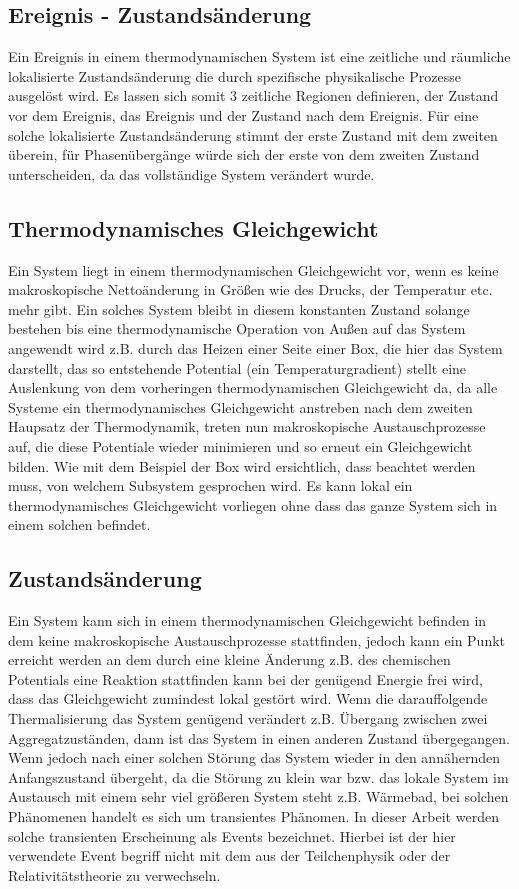 \subsection{Ereignis - Zustandsänderung}
\label{sec:theory-event}

Ein Ereignis in einem thermodynamischen System ist eine zeitliche und räumliche lokalisierte Zustandsänderung die durch spezifische physikalische Prozesse ausgelöst wird. Es lassen sich somit 3 zeitliche Regionen definieren, der Zustand vor dem Ereignis, das Ereignis und der Zustand nach dem Ereignis. Für eine solche lokalisierte Zustandsänderung stimmt der erste Zustand mit dem zweiten überein, für Phasenübergänge würde sich der erste von dem zweiten Zustand unterscheiden, da das vollständige System verändert wurde.

\subsection{Thermodynamisches Gleichgewicht}
Ein System liegt in einem thermodynamischen Gleichgewicht vor, wenn es keine makroskopische Nettoänderung in Größen wie des Drucks, der Temperatur etc. mehr gibt. Ein solches System bleibt in diesem konstanten Zustand solange bestehen bis eine thermodynamische Operation von Außen auf das System angewendt wird z.B. durch das Heizen einer Seite einer Box, die hier das System darstellt, das so entstehende Potential (ein Temperaturgradient) stellt eine Auslenkung von dem vorheringen thermodynamischen Gleichgewicht da, da alle Systeme ein thermodynamisches Gleichgewicht anstreben nach dem zweiten Haupsatz der Thermodynamik, treten nun makroskopische Austauschprozesse auf, die diese Potentiale wieder minimieren und so erneut ein Gleichgewicht bilden. Wie mit dem Beispiel der Box wird ersichtlich, dass beachtet werden muss, von welchem Subsystem gesprochen wird. Es kann lokal ein thermodynamisches Gleichgewicht vorliegen ohne dass das ganze System sich in einem solchen befindet.

\subsection{Zustandsänderung}
Ein System kann sich in einem thermodynamischen Gleichgewicht befinden in dem keine makroskopische Austauschprozesse stattfinden, jedoch kann ein Punkt erreicht werden an dem durch eine kleine Änderung z.B. des chemischen Potentials eine Reaktion stattfinden kann bei der genügend Energie frei wird, dass das Gleichgewicht zumindest lokal gestört wird. Wenn die darauffolgende Thermalisierung das System genügend verändert z.B. Übergang zwischen zwei Aggregatzuständen, dann ist das System in einen anderen Zustand übergegangen. Wenn jedoch nach einer solchen Störung das System wieder in den annähernden Anfangszustand übergeht, da die Störung zu klein war bzw. das lokale System im Austausch mit einem sehr viel größeren System steht z.B. Wärmebad, bei solchen Phänomenen handelt es sich um transientes Phänomen. In dieser Arbeit werden solche transienten Erscheinung als Events bezeichnet. Hierbei ist der hier verwendete Event begriff nicht mit dem aus der Teilchenphysik oder der Relativitätstheorie zu verwechseln.

